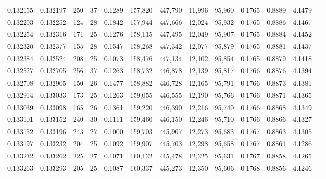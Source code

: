 \begin{tabular}{rrrrrrrrrrrrr}
0.132155 & 0.132197 &   250 &  37 &                                     0.1289 & 157,820 & 447,790 &  11,996 &  95,960 & 0.1765 & 0.8889 & 4.1479 \\
0.132203 & 0.132252 &   124 &  28 &                                     0.1842 & 157,944 & 447,666 &  12,024 &  95,932 & 0.1765 & 0.8886 & 4.1467 \\
0.132254 & 0.132316 &   171 &  25 &                                     0.1276 & 158,115 & 447,495 &  12,049 &  95,907 & 0.1765 & 0.8884 & 4.1452 \\
0.132320 & 0.132377 &   153 &  28 &                                     0.1547 & 158,268 & 447,342 &  12,077 &  95,879 & 0.1765 & 0.8881 & 4.1437 \\
0.132384 & 0.132524 &   208 &  25 &                                     0.1073 & 158,476 & 447,134 &  12,102 &  95,854 & 0.1765 & 0.8879 & 4.1418 \\
0.132527 & 0.132705 &   256 &  37 &                                     0.1263 & 158,732 & 446,878 &  12,139 &  95,817 & 0.1766 & 0.8876 & 4.1394 \\
0.132708 & 0.132905 &   150 &  26 &                                     0.1477 & 158,882 & 446,728 &  12,165 &  95,791 & 0.1766 & 0.8873 & 4.1381 \\
0.132914 & 0.133033 &   173 &  25 &                                     0.1263 & 159,055 & 446,555 &  12,190 &  95,766 & 0.1766 & 0.8871 & 4.1365 \\
0.133039 & 0.133098 &   165 &  26 &                                     0.1361 & 159,220 & 446,390 &  12,216 &  95,740 & 0.1766 & 0.8868 & 4.1349 \\
0.133101 & 0.133152 &   240 &  30 &                                     0.1111 & 159,460 & 446,150 &  12,246 &  95,710 & 0.1766 & 0.8866 & 4.1327 \\
0.133152 & 0.133196 &   243 &  27 &                                     0.1000 & 159,703 & 445,907 &  12,273 &  95,683 & 0.1767 & 0.8863 & 4.1305 \\
0.133197 & 0.133232 &   204 &  25 &                                     0.1092 & 159,907 & 445,703 &  12,298 &  95,658 & 0.1767 & 0.8861 & 4.1286 \\
0.133232 & 0.133262 &   225 &  27 &                                     0.1071 & 160,132 & 445,478 &  12,325 &  95,631 & 0.1767 & 0.8858 & 4.1265 \\
0.133263 & 0.133293 &   205 &  25 &                                     0.1087 & 160,337 & 445,273 &  12,350 &  95,606 & 0.1768 & 0.8856 & 4.1246 \\

\end{tabular}

